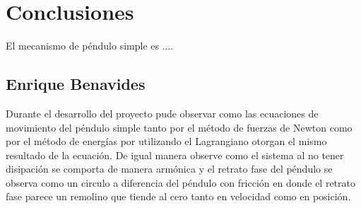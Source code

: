 \section{Conclusiones}
El mecanismo de péndulo simple es ....

\subsection{Enrique Benavides}

Durante el desarrollo del proyecto pude observar como las ecuaciones de movimiento del péndulo simple tanto por el método de fuerzas de Newton como por el método de energías por utilizando el Lagrangiano otorgan el mismo resultado de la ecuación. De igual manera observe como el sistema al no tener disipación se comporta de manera armónica y el retrato fase del péndulo se observa como un circulo a diferencia del péndulo con fricción en donde el retrato fase parece un remolino que tiende al cero tanto en velocidad como en posición.